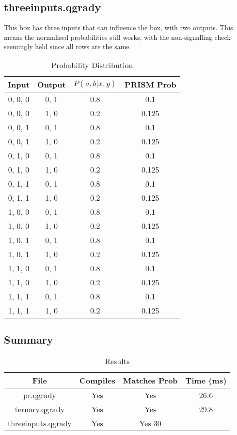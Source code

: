 \documentclass[report.tex]{subfiles}
\begin{document}
\subsection{threeinputs.qgrady} %
\label{sub:threeinputs_qgrady}
This box has three inputs that can influence the box, with two outputs. This
means the normalised probabilities still works, with the non-signalling check
seemingly held since all rows are the same.
\begin{table}[H]
  \centering
  \begin{tabular}{c | c | c | c}
    Input & Output & \(P(a, b | x, y)\) & PRISM Prob \\
    \hline
    0, 0, 0 & 0, 1 & 0.8 & 0.1 \\
    0, 0, 0 & 1, 0 & 0.2 & 0.125 \\
    0, 0, 1 & 0, 1 & 0.8 & 0.1 \\
    0, 0, 1 & 1, 0 & 0.2 & 0.125 \\
    0, 1, 0 & 0, 1 & 0.8 & 0.1 \\  
    0, 1, 0 & 1, 0 & 0.2 & 0.125 \\
    0, 1, 1 & 0, 1 & 0.8 & 0.1 \\  
    0, 1, 1 & 1, 0 & 0.2 & 0.125 \\
    1, 0, 0 & 0, 1 & 0.8 & 0.1 \\
    1, 0, 0 & 1, 0 & 0.2 & 0.125 \\
    1, 0, 1 & 0, 1 & 0.8 & 0.1 \\
    1, 0, 1 & 1, 0 & 0.2 & 0.125 \\
    1, 1, 0 & 0, 1 & 0.8 & 0.1 \\  
    1, 1, 0 & 1, 0 & 0.2 & 0.125 \\
    1, 1, 1 & 0, 1 & 0.8 & 0.1 \\  
    1, 1, 1 & 1, 0 & 0.2 & 0.125 \\
  \end{tabular}
  \caption{Probability Distribution}
  \label{tab:threeinputs_qgrady}
\end{table}

\subsection{Summary} %
\label{sub:prism_summary}
\begin{table}[H]
  \centering
  \begin{tabular}{c | c | c | c}
    File & Compiles & Matches Prob & Time (ms)\\
    \hline
    pr.qgrady & Yes & Yes & 26.6 \\
    ternary.qgrady & Yes & Yes & 29.8 \\
    threeinputs.qgrady & Yes & Yes 30\\
  \end{tabular}
  \caption{Results}
  \label{tab:prism_results}
\end{table}
\end{document}
